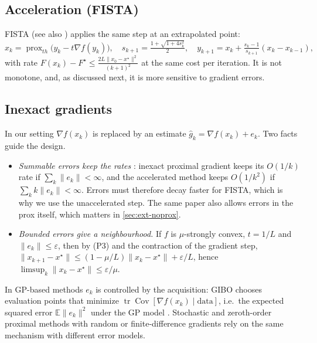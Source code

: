 \documentclass[10pt]{article}
\newcommand{\E}{\mathbb{E}}
\newcommand{\prox}{\operatorname{prox}}
\theoremstyle{remark}
\begin{document}
\subsection{Acceleration (FISTA)}
FISTA \citep{beck2009fista} (see also \citep{nesterov2013composite}) applies the same step at an extrapolated point:
\[
x_k=\prox_{th}\big(y_k-t\nabla f(y_k)\big),\quad s_{k+1}=\tfrac{1+\sqrt{1+4s_k^2}}{2},\quad
y_{k+1}=x_k+\tfrac{s_k-1}{s_{k+1}}(x_k-x_{k-1}),
\]
with rate $F(x_k)-F^\star\le\frac{2L\|x_0-x^\star\|^2}{(k+1)^2}$ at the same cost per iteration. It is not monotone, and, as discussed next, it is
more sensitive to gradient errors.

\subsection{Inexact gradients}\label{sec:inexact}
In our setting $\nabla f(x_k)$ is replaced by an estimate $\hat g_k=\nabla f(x_k)+e_k$. Two facts guide the design.
\begin{itemize}
\item \emph{Summable errors keep the rates} \citep{schmidt2011inexact}: inexact proximal gradient keeps its $O(1/k)$ rate if
$\sum_k\|e_k\|<\infty$, and the accelerated method keeps $O(1/k^2)$ if $\sum_k k\|e_k\|<\infty$. Errors must therefore decay faster for
FISTA, which is why we use the unaccelerated step. The same paper also allows errors in the prox itself, which matters in \cref{sec:ext-noprox}.
\item \emph{Bounded errors give a neighbourhood.} If $f$ is $\mu$-strongly convex, $t=1/L$ and $\|e_k\|\le\varepsilon$, then by (P3) and the
contraction of the gradient step, $\|x_{k+1}-x^\star\|\le(1-\mu/L)\|x_k-x^\star\|+\varepsilon/L$, hence
$\limsup_k\|x_k-x^\star\|\le\varepsilon/\mu$.
\end{itemize}
In GP-based methods $e_k$ is controlled by the acquisition: GIBO chooses evaluation points that minimize
$\operatorname{tr}\operatorname{Cov}[\nabla f(x_k)\mid\text{data}]$, i.e.\ the expected squared error $\E\|e_k\|^2$ under the GP model
\citep{muller2021gibo}. Stochastic and zeroth-order proximal methods with random or finite-difference gradients
\citep{ghadimi2016mini,nesterov2017random,huang2019zoprox,cai2022zoro} rely on the same mechanism with different error models.
\end{document}
